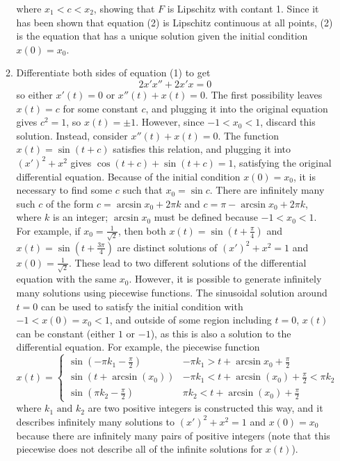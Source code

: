 \documentclass{exam}
\begin{document}
\begin{enumerate}
\begin{enumerate}
        where $x_1 < c < x_2$, showing that $F$ is Lipschitz with contant 1. Since it has been shown that equation (2) is Lipschitz continuous at all points, (2) is the equation that has a unique solution given the initial condition $x(0) = x_0$.
        \item Differentiate both sides of equation (1) to get
        \begin{equation*}
            2{x'}{x''}+2{x'}{x} = 0
        \end{equation*}
        so either $x'(t) = 0$ or $x''(t) + x(t) = 0$. The first possibility leaves $x(t) = c$ for some constant $c$, and plugging it into the original equation gives $c^2 = 1$, so $x(t) = \pm 1$. However, since $-1 < x_0 < 1$, discard this solution. Instead, consider $x''(t) + x(t) = 0$. The function $x(t) = \sin\left(t+c\right)$ satisfies this relation, and plugging it into $\left(x'\right)^2 + x^2$ gives $\cos\left(t+c\right) + \sin\left(t+c\right) = 1$, satisfying the original differential equation. Because of the initial condition $x(0) = x_0$, it is necessary to find some $c$ such that $x_0 = \sin c$. There are infinitely many such $c$ of the form $c = \arcsin{x_0} + 2\pi k$ and $c = \pi-\arcsin{x_0} + 2\pi k$, where $k$ is an integer; $\arcsin{x_0}$ must be defined because $-1 < x_0 < 1$. For example, if $x_0 = \frac{1}{\sqrt{2}}$, then both $x(t) = \sin\left(t+\frac{\pi}{4}\right)$ and $x(t) = \sin\left(t + \frac{3\pi}{4}\right)$ are distinct solutions of $\left(x'\right)^2 + x^2 = 1$ and $x(0) = \frac{1}{\sqrt{2}}$. These lead to two different solutions of the differential equation with the same $x_0$. However, it is possible to generate infinitely many solutions using piecewise functions. The sinusoidal solution around $t = 0$ can be used to satisfy the initial condition with $-1 < x(0) = x_0 < 1$, and outside of some region including $t = 0$, $x(t)$ can be constant (either $1$ or $-1$), as this is also a solution to the differential equation. For example, the piecewise function
        $$x(t) = 
        \begin{cases}
            \sin\left(-\pi k_1 -\frac{\pi}{2}\right) & -\pi k_1 > t + \arcsin{x_0} + \frac{\pi}{2} \\
            \sin\left(t+\arcsin\left(x_{0}\right)\right) & -\pi k_{1}<t+\arcsin\left(x_{0}\right)+\frac{\pi}{2}<\pi k_{2} \\
            \sin\left(\pi k_{2}-\frac{\pi}{2}\right) & \pi k_{2}<t+\arcsin\left(x_{0}\right)+\frac{\pi}{2}
        \end{cases}$$
        where $k_1\text{ and } k_2$ are two positive integers is constructed this way, and it describes infinitely many solutions to $\left(x'\right)^2 + x^2 = 1$ and $x(0) = x_0$ because there are infinitely many pairs of positive integers (note that this piecewise does not describe all of the infinite solutions for $x(t)$).
    \end{enumerate}
\end{enumerate}
\end{document}
